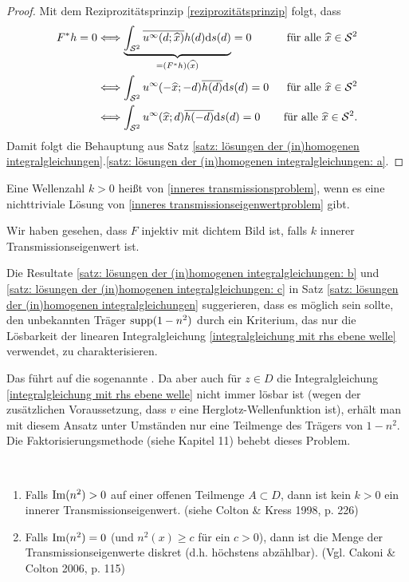 \begin{proof}
	Mit dem Reziprozitätsprinzip \eqref{reziprozitätsprinzip} folgt, dass
	\begin{align*}
		F^\ast h=0
		&\Longleftrightarrow \underbrace{\int_{\mathcal{S}^2}\overline{u^\infty(d;\widehat{x})}h(d)\mathrm{d}s(d)}_{=(F^\ast h)(\widehat{x})} = 0&\text{ für alle }\widehat{x}\in\mathcal{S}^2\\
		&\Longleftrightarrow \int_{\mathcal{S}^2}u^\infty(-\widehat{x};-d)\overline{h(d)}\mathrm{d}s(d) = 0&\text{ für alle }\widehat{x}\in\mathcal{S}^2\\
		&\Longleftrightarrow\int_{\mathcal{S}^2}u^\infty(\widehat{x};d)\overline{h(-d)}\mathrm{d}s(d) = 0&\text{ für alle }\widehat{x}\in\mathcal{S}^2.
	\end{align*}
	Damit folgt die Behauptung aus Satz \ref{satz: lösungen der (in)homogenen integralgleichungen}.\ref{satz: lösungen der (in)homogenen integralgleichungen: a}.
\end{proof}
\begin{definition}
	Eine Wellenzahl \(k>0\) heißt  von \eqref{inneres transmissionsproblem}, wenn es eine nichttriviale Lösung von \eqref{inneres transmissionseigenwertproblem} gibt.
\end{definition}
Wir haben gesehen, dass \(F\) injektiv mit dichtem Bild ist, falls \(k\)  innerer Transmissionseigenwert ist.
\begin{counter bem plain}
	Die Resultate \ref{satz: lösungen der (in)homogenen integralgleichungen: b} und \ref{satz: lösungen der (in)homogenen integralgleichungen: c} in Satz \ref{satz: lösungen der (in)homogenen integralgleichungen} suggerieren, dass es möglich sein sollte, den unbekannten Träger \(\operatorname{supp}(1-n^2)\) durch ein Kriterium, das nur die Lösbarkeit der linearen Integralgleichung \eqref{integralgleichung mit rhs ebene welle} verwendet, zu charakterisieren.
	
	Das führt auf die sogenannte . Da aber auch für \(z\in D\) die Integralgleichung \eqref{integralgleichung mit rhs ebene welle} nicht immer lösbar ist (wegen der zusätzlichen Voraussetzung, dass \(v\) eine Herglotz-Wellenfunktion ist), erhält man mit diesem Ansatz unter Umständen nur eine Teilmenge des Trägers von \(1-n^2\). Die Faktorisierungsmethode (siehe Kapitel 11) behebt dieses Problem.
\end{counter bem plain}
\begin{counter bem}\
	\begin{enumerate}[label=(\alph*)]
		\item Falls \(\operatorname{Im}(n^2)>0\) auf einer offenen Teilmenge \(A\subset D\), dann ist kein \(k>0\) ein innerer Transmissionseigenwert. (siehe Colton \& Kress 1998, p. 226)
		\item Falls \(\operatorname{Im}(n^2)=0\) (und \(n^2(x)\geq c\) für ein \(c>0\)), dann ist die Menge der Transmissionseigenwerte diskret (d.h. höchstens abzählbar). (Vgl. Cakoni \& Colton 2006, p. 115)
	\end{enumerate}
\end{counter bem}





















